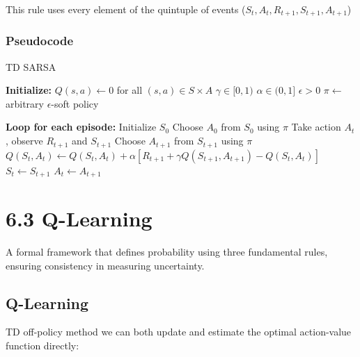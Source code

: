 \documentclass[
  letterpaper,
  DIV=11,
  numbers=noendperiod]{scrreprt}
\begin{document}
This rule uses every element of the quintuple of events
(\(S_{t}, A_{t}, R_{t+1}, S_{t+1}, A_{t+1}\))

\subsection{Pseudocode}\label{pseudocode-10}

\begin{algorithm}[htb!]
\caption{TD SARSA}
\begin{algorithmic}[1]
\State \textbf{Initialize:} 
\State $Q(s, a) \gets 0$ for all $(s, a) \in S \times A$
\State $\gamma \in [0, 1)$
\State $\alpha \in (0, 1]$
\State $\epsilon > 0$
\State $\pi \gets$ arbitrary $\epsilon$-soft policy

\State \textbf{Loop for each episode:}
\State Initialize $S_{0}$
\State Choose $A_{0}$ from $S_{0}$ using $\pi$
\Repeat
    \State Take action $A_{t}$, observe $R_{t+1}$ and $S_{t+1}$
    \State Choose $A_{t+1}$ from $S_{t+1}$ using $\pi$
    \State $Q(S_{t}, A_{t}) \gets Q(S_{t}, A_{t}) + \alpha \left[R_{t+1} + \gamma Q(S_{t+1}, A_{t+1}) - Q(S_{t}, A_{t})\right]$
    \State $S_{t} \gets S_{t+1}$
    \State $A_{t} \gets A_{t+1}$

\end{algorithmic}
\end{algorithm}

\chapter{6.3 Q-Learning}\label{q-learning}

\begin{tcolorbox}[enhanced jigsaw, colback=white, left=2mm, breakable, opacityback=0, bottomrule=.15mm, rightrule=.15mm, arc=.35mm, colframe=quarto-callout-note-color-frame, leftrule=.75mm, toprule=.15mm]

A formal framework that defines probability using three fundamental
rules, ensuring consistency in measuring uncertainty. 🎲

\end{tcolorbox}

\section{Q-Learning}\label{q-learning-1}

TD off-policy method we can both update and estimate the optimal
action-value function directly:
\end{document}
